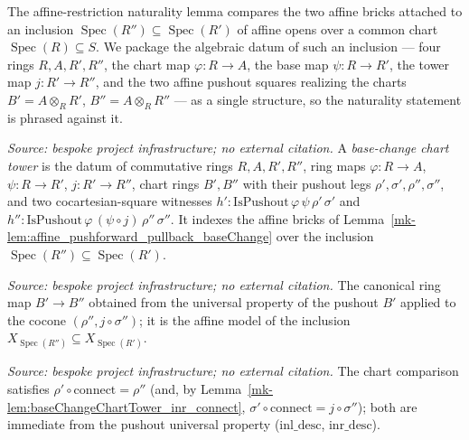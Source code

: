 The affine-restriction naturality lemma compares the two affine bricks attached to an
inclusion \(\operatorname{Spec}(R'') \subseteq \operatorname{Spec}(R')\) of affine opens
over a common chart \(\operatorname{Spec}(R) \subseteq S\). We package the algebraic datum
of such an inclusion --- four rings \(R, A, R', R''\), the chart map \(\varphi : R \to A\),
the base map \(\psi : R \to R'\), the tower map \(j : R' \to R''\), and the two affine
pushout squares realizing the charts \(B' = A \otimes_R R'\), \(B'' = A \otimes_R R''\) ---
as a single structure, so the naturality statement is phrased against it.

\begin{definition}\label{mk-def:baseChangeChartTower}
  \leanok

  \textit{Source: bespoke project infrastructure; no external citation.}
  A \emph{base-change chart tower} is the datum of commutative rings \(R, A, R', R''\),
  ring maps \(\varphi : R \to A\), \(\psi : R \to R'\), \(j : R' \to R''\), chart rings
  \(B', B''\) with their pushout legs \(\rho', \sigma', \rho'', \sigma''\), and two
  cocartesian-square witnesses \(h' : \mathrm{IsPushout}\,\varphi\,\psi\,\rho'\,\sigma'\)
  and \(h'' : \mathrm{IsPushout}\,\varphi\,(\psi \circ j)\,\rho''\,\sigma''\). It indexes
  the affine bricks of Lemma~\ref{mk-lem:affine_pushforward_pullback_baseChange} over the
  inclusion \(\operatorname{Spec}(R'') \subseteq \operatorname{Spec}(R')\).
\end{definition}

\begin{definition}\label{mk-def:baseChangeChartTower_connect}
  \leanok

  \textit{Source: bespoke project infrastructure; no external citation.}
  The canonical ring map \(B' \to B''\) obtained from the universal property of the
  pushout \(B'\) applied to the cocone \((\rho'', j \circ \sigma'')\); it is the affine
  model of the inclusion \(X_{\operatorname{Spec}(R'')} \subseteq X_{\operatorname{Spec}(R')}\).
\end{definition}

\begin{lemma}\label{mk-lem:baseChangeChartTower_inl_connect}
  \leanok

  \textit{Source: bespoke project infrastructure; no external citation.}
  The chart comparison satisfies \(\rho' \circ \mathrm{connect} = \rho''\) (and, by
  Lemma~\ref{mk-lem:baseChangeChartTower_inr_connect}, \(\sigma' \circ \mathrm{connect}
  = j \circ \sigma''\)); both are immediate from the pushout universal property
  (\(\mathrm{inl\_desc}\), \(\mathrm{inr\_desc}\)).
\end{lemma}

